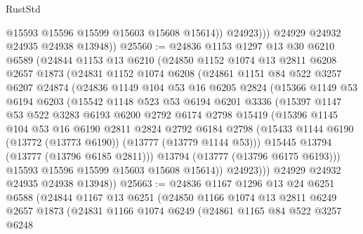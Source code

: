 \begin{lexlean}{RustStd}
\begin{coremodule}
                  @15593
                  @15596
                  @15599
                  @15603
                  @15608
                  @15614))
              @24923)))
        @24929
        @24932
        @24935
        @24938
        @13948))
@25560 := @24836
    @1153
    @1297
    @13
    @30
    @6210
    @6589
    (@24844
      @1153
      @13
      @6210
      (@24850
        @1152
        @1074
        @13
        @2811
        @6208
        @2657
        @1873
        (@24831
          @1152
          @1074
          @6208
          (@24861
            @1151
            @84
            @522
            @3257
            @6207
            @24874
            (@24836
              @1149
              @104
              @53
              @16
              @6205
              @2824
              (@15366
                @1149
                @53
                @6194
                @6203
                (@15542
                  @1148
                  @523
                  @53
                  @6194
                  @6201
                  @3336
                  (@15397
                    @1147
                    @53
                    @522
                    @3283
                    @6193
                    @6200
                    @2792
                    @6174
                    @2798
                    @15419
                    (@15396
                      @1145
                      @104
                      @53
                      @16
                      @6190
                      @2811
                      @2824
                      @2792
                      @6184
                      @2798
                      (@15433 @1144 @6190 (@13772 (@13773 @6190)) (@13777 (@13779 @1144 @53)))
                      @15445
                      @13794
                      (@13777 (@13796 @6185 @2811)))
                    @13794
                    (@13777 (@13796 @6175 @6193)))
                  @15593
                  @15596
                  @15599
                  @15603
                  @15608
                  @15614))
              @24923)))
        @24929
        @24932
        @24935
        @24938
        @13948))
@25663 := @24836
    @1167
    @1296
    @13
    @24
    @6251
    @6588
    (@24844
      @1167
      @13
      @6251
      (@24850
        @1166
        @1074
        @13
        @2811
        @6249
        @2657
        @1873
        (@24831
          @1166
          @1074
          @6249
          (@24861
            @1165
            @84
            @522
            @3257
            @6248

\end{coremodule}
\end{lexlean}
